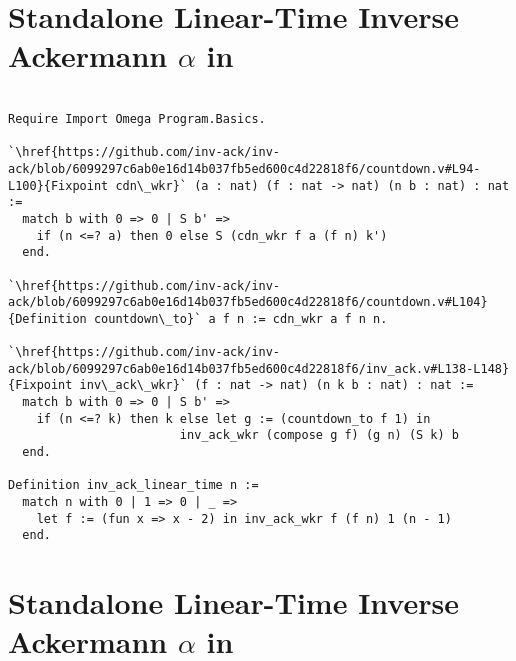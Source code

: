 \vspace{-1.25em}
\section{Standalone Linear-Time Inverse Ackermann $\alpha$ in }
\label{apx:code}

\vspace{-1em}
\lstset{style=myTinyStyle}
\begin{lstlisting}

Require Import Omega Program.Basics.

`\href{https://github.com/inv-ack/inv-ack/blob/6099297c6ab0e16d14b037fb5ed600c4d22818f6/countdown.v#L94-L100}{Fixpoint cdn\_wkr}` (a : nat) (f : nat -> nat) (n b : nat) : nat :=
  match b with 0 => 0 | S b' =>
    if (n <=? a) then 0 else S (cdn_wkr f a (f n) k')
  end.

`\href{https://github.com/inv-ack/inv-ack/blob/6099297c6ab0e16d14b037fb5ed600c4d22818f6/countdown.v#L104}{Definition countdown\_to}` a f n := cdn_wkr a f n n.

`\href{https://github.com/inv-ack/inv-ack/blob/6099297c6ab0e16d14b037fb5ed600c4d22818f6/inv_ack.v#L138-L148} {Fixpoint inv\_ack\_wkr}` (f : nat -> nat) (n k b : nat) : nat :=
  match b with 0 => 0 | S b' =>
    if (n <=? k) then k else let g := (countdown_to f 1) in
                        inv_ack_wkr (compose g f) (g n) (S k) b
  end.

Definition inv_ack_linear_time n :=
  match n with 0 | 1 => 0 | _ => 
    let f := (fun x => x - 2) in inv_ack_wkr f (f n) 1 (n - 1)
  end.
\end{lstlisting}


\section{Standalone Linear-Time Inverse Ackermann $\alpha$ in }
\label{apx:code_n}

